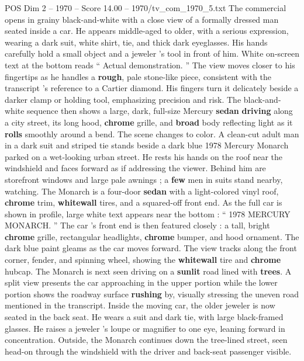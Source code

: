 \begin{textsample}{POS Dim 2 – 1970 – Score 14.00 – 1970/tv\_com\_1970\_5.txt}  \label{ex:f2_pos_075}
The commercial opens in grainy black-and-white with a close view of a formally dressed man seated inside a car.
He appears middle-aged to older, with a serious expression, wearing a dark suit, white shirt, tie, and thick dark eyeglasses.
His hands carefully hold a small object and a jeweler ’s tool in front of him.
White on-screen text at the bottom reads “ Actual demonstration. ” The view moves closer to his fingertips as he handles a \textbf{rough}, pale stone-like piece, consistent with the transcript ’s reference to a Cartier diamond.
His fingers turn it delicately beside a darker clamp or holding tool, emphasizing precision and risk.
The black-and-white sequence then shows a large, dark, full-size Mercury \textbf{sedan} \textbf{driving} along a city street, its long hood, \textbf{chrome} grille, and \textbf{broad} body reflecting light as it \textbf{rolls} smoothly around a bend.
The scene changes to color.
A clean-cut adult man in a dark suit and striped tie stands beside a dark blue 1978 Mercury Monarch parked on a wet-looking urban street.
He rests his hands on the roof near the windshield and faces forward as if addressing the viewer.
Behind him are storefront windows and large pale awnings ; a \textbf{few} men in suits stand nearby, watching.
The Monarch is a four-door \textbf{sedan} with a light-colored vinyl roof, \textbf{chrome} trim, \textbf{whitewall} tires, and a squared-off front end.
As the full car is shown in profile, large white text appears near the bottom : “ 1978 MERCURY MONARCH. ” The car ’s front end is then featured closely : a tall, bright \textbf{chrome} grille, rectangular headlights, \textbf{chrome} bumper, and hood ornament.
The dark blue paint gleams as the car moves forward.
The view tracks along the front corner, fender, and spinning wheel, showing the \textbf{whitewall} tire and \textbf{chrome} hubcap.
The Monarch is next seen driving on a \textbf{sunlit} road lined with \textbf{trees}.
A split view presents the car approaching in the upper portion while the lower portion shows the roadway surface \textbf{rushing} by, visually stressing the uneven road mentioned in the transcript.
Inside the moving car, the older jeweler is now seated in the back seat.
He wears a suit and dark tie, with large black-framed glasses.
He raises a jeweler ’s loupe or magnifier to one eye, leaning forward in concentration.
Outside, the Monarch continues down the tree-lined street, seen head-on through the windshield with the driver and back-seat passenger visible.

\end{textsample}
